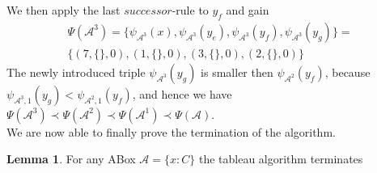 \documentclass{book}
\theoremstyle{break}
\theoremstyle{definition}
\newtheorem{mylem}{Lemma}
\begin{document}
We then apply the last $successor$-rule to $y_f$ and gain
\begin{align}
\Psi(\mathcal{A}^3)=\{\psi_{\mathcal{A}^3}(x),\psi_{\mathcal{A}^3}(y_e), \psi_{\mathcal{A}^3}(y_f),\psi_{\mathcal{A}^3}(y_g)\}=\nonumber\\
\{(7,\{\},0),(1,\{\},0),(3,\{\},0),(2,\{\},0)\}
\end{align}
The newly introduced triple $\psi_{\mathcal{A}^3}(y_g)$ is smaller then $\psi_{\mathcal{A}^2}(y_f)$, because $\psi_{\mathcal{A}^3,1}(y_g)<\psi_{\mathcal{A}^2,1}(y_f)$, and hence we have $\Psi(\mathcal{A}^3)\prec \Psi(\mathcal{A}^2)\prec\Psi(\mathcal{A}^1)\prec\Psi(\mathcal{A})$.\\
We are now able to finally prove the termination of the algorithm.
\begin{mylem}
For any ABox $\mathcal{A}=\{x:C\}$ the tableau algorithm terminates
\end{mylem}
\end{document}
